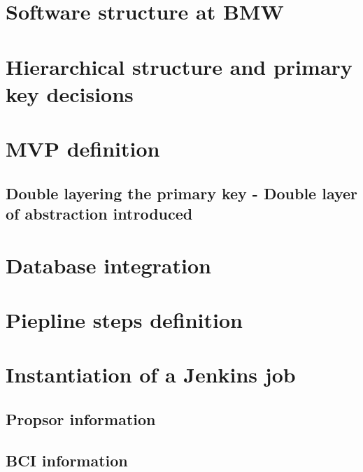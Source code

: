 \documentclass[../main.tex]{subfiles}
\begin{document}
\section{Software structure at BMW}
\section{Hierarchical structure and primary key decisions}
\section{MVP definition}
\subsection{Double layering the primary key - Double layer of abstraction introduced}
\section{Database integration}
\section{Piepline steps definition}
\section{Instantiation of a Jenkins job}
\subsection{Propsor information}
\subsection{BCI information}
\cleardoublepage
\end{document}
